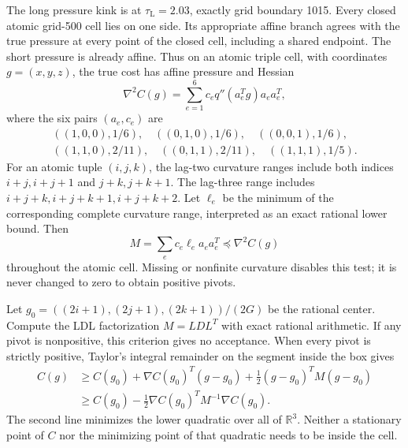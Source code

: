 \documentclass[11pt]{amsart}
\numberwithin{equation}{section}
\newcommand{\R}{\mathbb R}
\newcommand{\tL}{\tau_{\mathrm L}}
\begin{document}
The long pressure kink is at $\tL=2.03$, exactly grid boundary
1015. Every closed atomic grid-500 cell lies on one side. Its
appropriate affine branch agrees with the true pressure at every
point of the closed cell, including a shared endpoint. The short
pressure is already affine. Thus on an atomic triple cell, with
coordinates $g=(x,y,z)$, the true cost has affine pressure and
Hessian
\begin{equation}\label{eq:triplehessian}
 \nabla^2 C(g)=\sum_{e=1}^6 c_e q''(a_e^Tg)a_ea_e^T,
\end{equation}
where the six pairs $(a_e,c_e)$ are
\begin{equation}\label{eq:incidences}
 \begin{gathered}
 ((1,0,0),1/6),\quad ((0,1,0),1/6),\quad((0,0,1),1/6),\\
 ((1,1,0),2/11),\quad((0,1,1),2/11),\quad((1,1,1),1/5).
 \end{gathered}
\end{equation}
For an atomic tuple $(i,j,k)$, the lag-two curvature ranges
include both indices $i+j,i+j+1$ and $j+k,j+k+1$. The
lag-three range includes $i+j+k,i+j+k+1,i+j+k+2$.
Let $\ell_e$ be the minimum of the corresponding complete
curvature range, interpreted as an exact rational lower bound.
Then
\begin{equation}\label{eq:tripleM}
 M=\sum_ec_e\ell_ea_ea_e^T\preceq\nabla^2C(g)
\end{equation}
throughout the atomic cell. Missing or nonfinite curvature disables
this test; it is never changed to zero to obtain positive pivots.

Let $g_0=((2i+1),(2j+1),(2k+1))/(2G)$ be the rational center.
Compute the LDL factorization $M=LDL^T$ with exact rational
arithmetic. If any pivot is nonpositive, this criterion gives no
acceptance. When every pivot is strictly positive, Taylor's
integral remainder on the segment inside the box gives
\begin{align}
 C(g)&\geq C(g_0)+\nabla C(g_0)^T(g-g_0)
                        +\tfrac12(g-g_0)^TM(g-g_0)\nonumber\\
 &\geq C(g_0)-\tfrac12\nabla C(g_0)^TM^{-1}\nabla C(g_0).
 \label{eq:atomictaylor}
\end{align}
The second line minimizes the lower quadratic over all of
$\R^3$. Neither a stationary point of $C$ nor the minimizing
point of that quadratic needs to be inside the cell.
\end{document}
